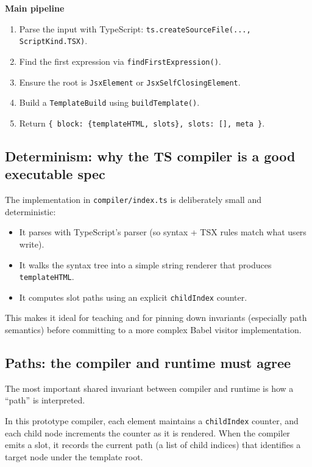 \textbf{Main pipeline}

\begin{enumerate}
\item Parse the input with TypeScript: \texttt{ts.createSourceFile(..., ScriptKind.TSX)}.
\item Find the first expression via \texttt{findFirstExpression()}.
\item Ensure the root is \texttt{JsxElement} or \texttt{JsxSelfClosingElement}.
\item Build a \texttt{TemplateBuild} using \texttt{buildTemplate()}.
\item Return \texttt{\{ block: \{templateHTML, slots\}, slots: [], meta \}}.
\end{enumerate}

\subsection{Determinism: why the TS compiler is a good executable spec}

The implementation in \texttt{compiler/index.ts} is deliberately small and deterministic:

\begin{itemize}
\item It parses with TypeScript's parser (so syntax + TSX rules match what users write).
\item It walks the syntax tree into a simple string renderer that produces \texttt{templateHTML}.
\item It computes slot paths using an explicit \texttt{childIndex} counter.
\end{itemize}

This makes it ideal for teaching and for pinning down invariants (especially path semantics) before committing to a more complex Babel visitor implementation.

\subsection{Paths: the compiler and runtime must agree}

The most important shared invariant between compiler and runtime is how a ``path'' is interpreted.

In this prototype compiler, each element maintains a \texttt{childIndex} counter, and each child node increments the counter as it is rendered.
When the compiler emits a slot, it records the current path (a list of child indices) that identifies a target node under the template root.

